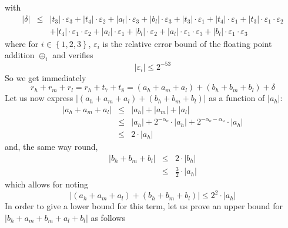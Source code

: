 \documentclass[a4paper,10pt,twoside]{article}
\newenvironment{proof}[1][Proof]{\begin{trivlist}
\item[\hskip \labelsep {\bfseries #1}]}{\end{trivlist}}
\newcommand{\hi}{\ensuremath{\mathit{h}}}
\newcommand{\mi}{\ensuremath{\mathit{m}}}
\newcommand{\lo}{\ensuremath{\mathit{l}}}
\renewcommand{\epsilon}{\varepsilon}
\begin{document}
\begin{proof}
with
\begin{eqnarray*}
\left \vert \delta \right \vert & \leq & \left \vert t_3 \right \vert \cdot \epsilon_3 + \left \vert t_4 \right \vert \cdot \epsilon_2 +
\left \vert a_\lo \right \vert \cdot \epsilon_3 + \left \vert b_\lo \right \vert \cdot \epsilon_3 + \left \vert t_3 \right \vert \cdot \epsilon_1
+ \left \vert t_4 \right \vert \cdot \epsilon_1 + \left \vert t_3 \right \vert \cdot \epsilon_1 \cdot \epsilon_2 \\
& & + \left \vert t_4 \right \vert \cdot \epsilon_1 \cdot \epsilon_2 + \left \vert a_\lo \right \vert \cdot \epsilon_1 +
\left \vert b_\lo \right \vert \cdot \epsilon_2 + \left \vert a_\lo \right \vert \cdot \epsilon_1 \cdot \epsilon_3 +
\left \vert b_\lo \right \vert \cdot \epsilon_1 \cdot \epsilon_3
\end{eqnarray*}
where for $i\in\left\lbrace 1,2,3 \right\rbrace$, $\epsilon_i$ is the relative
error bound of the floating point addition $\oplus_i$ and verifies
$$\left \vert \epsilon_i \right \vert \leq 2^{-53}$$
So we get immediately
$$r_\hi + r_\mi + r_\lo = r_\hi + t_7 + t_8 = \left( a_\hi + a_\mi + a_\lo \right) + \left( b_\hi + b_\mi + b_\lo \right) + \delta$$
Let us now express $\left \vert \left( a_\hi + a_\mi + a_\lo \right) + \left(
    b_\hi + b_\mi + b_\lo \right) \right \vert$
as a function of
$\left \vert a_\hi \right \vert$:
\begin{eqnarray*}
\left \vert a_\hi + a_\mi + a_\lo \right \vert & \leq & \left \vert a_\hi \right \vert + \left \vert a_\mi \right \vert +
\left \vert a_\lo \right \vert \\
& \leq & \left \vert a_\hi \right \vert + 2^{-\alpha_o} \cdot \left \vert a_\hi \right \vert +
2^{-\alpha_o-\alpha_u} \cdot \left \vert a_\hi \right \vert \\
& \leq & 2 \cdot \left \vert a_\hi \right \vert
\end{eqnarray*}
and, the same way round,
\begin{eqnarray*}
\left \vert b_\hi + b_\mi + b_\lo \right \vert & \leq & 2 \cdot \left \vert b_\hi \right \vert \\
& \leq & \frac{3}{2} \cdot \left \vert a_\hi \right \vert
\end{eqnarray*}
which allows for noting
$$\left \vert \left( a_\hi + a_\mi + a_\lo \right) + \left( b_\hi + b_\mi + b_\lo \right) \right \vert \leq 2^2 \cdot \left \vert a_\hi \right \vert$$
In order to give a lower bound for this term, let us prove an upper bound for
$\left \vert b_\hi + a_\mi + b_\mi + a_\lo + b_\lo \right \vert$ as follows

\end{proof}
\end{document}
